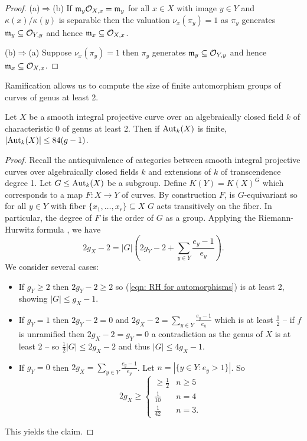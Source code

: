 \begin{proof}
    (a)$\Rightarrow$(b) If $\mathfrak{m}_{y}\mathcal{O}_{X,x}=\mathfrak{m}_{y}$ for all $x\in X$ with image $y\in Y$ and $\kappa(x)/\kappa(y)$ is separable then the valuation $\nu_{x}(\pi_{y})=1$ as $\pi_{y}$ generates $\mathfrak{m}_{y}\subseteq\mathcal{O}_{Y,y}$ and hence $\mathfrak{m}_{x}\subseteq\mathcal{O}_{X,x}$. 

    (b)$\Rightarrow$(a) Suppose $\nu_{x}(\pi_{y})=1$ then $\pi_{y}$ generates $\mathfrak{m}_{y}\subseteq\mathcal{O}_{Y,y}$ and hence $\mathfrak{m}_{x}\subseteq\mathcal{O}_{X,x}$. 
\end{proof}
Ramification allows us to compute the size of finite automorphism groups of curves of genus at least 2. 
\begin{proposition}\label{prop: bound on automorphism groups of curves}
    Let $X$ be a smooth integral projective curve over an algebraically closed field $k$ of characteristic 0 of genus at least 2. Then if $\mathrm{Aut}_{k}(X)$ is finite, $|\mathrm{Aut}_{k}(X)|\leq 84(g-1)$. 
\end{proposition}
\begin{proof}
    Recall the antiequivalence of categories between smooth integral projective curves over algebraically closed fields $k$ and extensions of $k$ of transcendence degree 1. Let $G\leq\mathrm{Aut}_{k}(X)$ be a subgroup. Define $K(Y)=K(X)^{G}$ which corresponds to a map $F:X\to Y$ of curves. By construction $F$, is $G$-equivariant so for all $y\in Y$ with fiber $\{x_{1},\dots,x_{r}\}\subseteq X$ $G$ acts transitively on the fiber. In particular, the degree of $F$ is the order of $G$ as a group. Applying the Riemann-Hurwitz formula , we have 
    \begin{equation}\label{eqn: RH for automorphisms}
        2g_{X}-2=|G|(2g_{Y}-2+\sum_{y\in Y}\frac{e_{y}-1}{e_{y}}).
    \end{equation}
    We consider several cases: 
    \begin{itemize}
        \item If $g_{Y}\geq2$ then $2g_{Y}-2\geq2$ so (\ref{eqn: RH for automorphisms}) is at least 2, showing $|G|\leq g_{X}-1$. 
        \item If $g_{Y}=1$ then $2g_{Y}-2=0$ and $2g_{X}-2=\sum_{y\in Y}\frac{e_{y}-1}{e_{y}}$ which is at least $\frac{1}{2}$ -- if $f$ is unramified then $2g_{X}-2=g_{Y}=0$ a contradiction as the genus of $X$ is at least 2 -- so $\frac{1}{2}|G|\leq 2g_{X}-2$ and thus $|G|\leq 4g_{X}-1$.
        \item If $g_{Y}=0$ then $2g_{X}=\sum_{y\in Y}\frac{e_{y}-1}{e_{y}}$. Let $n=|\{y\in Y:e_{y}>1\}|$. So 
        $$2g_{X}\geq\begin{cases}
            \geq\frac{1}{2} & n\geq 5 \\ \frac{1}{10} & n=4 \\ \frac{1}{42} & n=3.
        \end{cases}$$
    \end{itemize}
    This yields the claim. 
\end{proof}
